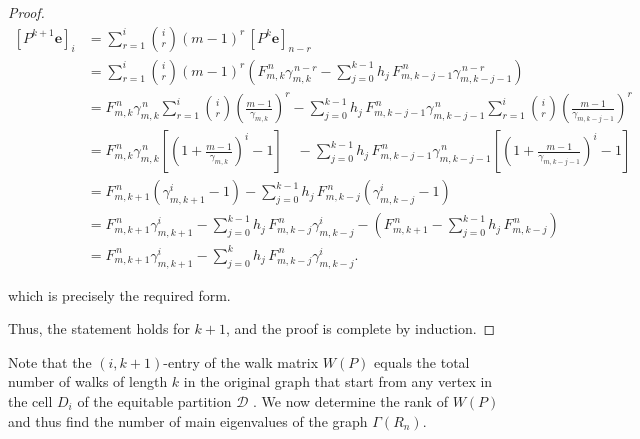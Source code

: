 \documentclass[11pt,oneside]{article}
\theoremstyle{plain}
\theoremstyle{plain}
\theoremstyle{definition}
\numberwithin{figure}{section}
\theoremstyle{remark}
\numberwithin{equation}{section}
\begin{document}
\begin{proof}
		\begin{align*}
			\left[ P^{k+1} \mathbf{e} \right]_i
			&= \sum_{r=1}^{i} \binom{i}{r} (m-1)^r \, \left[ P^{k} \mathbf{e} \right]_{n-r}\\
			&= \sum_{r=1}^{i} \binom{i}{r} (m-1)^r
			\left(
			F_{m,k}^{\,n }  \gamma_{m,k}^{\,n-r} 
			- \sum_{j=0}^{k-1} h_j \, F_{m,k-j-1}^{\,n } \gamma_{m,k-j-1}^{\,n-r}
			\right)\\
			&= F_{m,k}^{\,n}  \gamma_{m,k}^{\,n}
			\sum_{r=1}^{i} \binom{i}{r} \left(\frac{m-1}{\gamma_{m,k}}\right)^r
			- \sum_{j=0}^{k-1} h_j \, F_{m,k-j-1}^{\,n}  \gamma_{m,k-j-1}^{\,n}
			\sum_{r=1}^{i} \binom{i}{r} \left(\frac{m-1}{\gamma_{m,k-j-1}}\right)^r\\
			&= F_{m,k}^{\,n}  \gamma_{m,k}^{\,n}
			\left[\left(1 + \frac{m-1}{\gamma_{m,k}}\right)^i - 1\right]
			\quad - \sum_{j=0}^{k-1} h_j \, F_{m,k-j-1}^{\,n}  \gamma_{m,k-j-1}^{\,n}
			\left[\left(1 + \frac{m-1}{\gamma_{m,k-j-1}}\right)^i - 1\right]\\
			&= F_{m,k+1}^{\,n}  \left( \gamma_{m,k+1}^i - 1 \right)
			- \sum_{j=0}^{k-1} h_j \, F_{m,k-j}^{\,n} \left( \gamma_{m,k-j}^i - 1 \right)\\
			&= F_{m,k+1}^{\,n} \gamma_{m,k+1}^i 
			- \sum_{j=0}^{k-1} h_j \, F_{m,k-j}^{\,n} \gamma_{m,k-j}^i  
			- \left(F_{m,k+1}^{\,n} - \sum_{j=0}^{k-1} h_j \, F_{m,k-j}^{\,n}\right)\\
			&= F_{m,k+1}^{\,n} \gamma_{m,k+1}^i 
			- \sum_{j=0}^{k} h_j \, F_{m,k-j}^{\,n} \gamma_{m,k-j}^i.
		\end{align*}
		
		
		
		
		
		which is precisely the required form.
		
		Thus, the statement holds for \(k+1\), and the proof is complete by induction.
	\end{proof}
	
	Note that the $(i,k + 1)$-entry of the walk matrix $W(P)$ equals the total number of walks of length $k$ in the original graph that start from any vertex in the cell $D_i$ of the equitable partition $\mathcal{D}$ \cite{rowlinson}. We now determine the rank of  $W(P)$ and thus find the number of main eigenvalues of the graph $\Gamma(R_n).$
	
\end{document}
